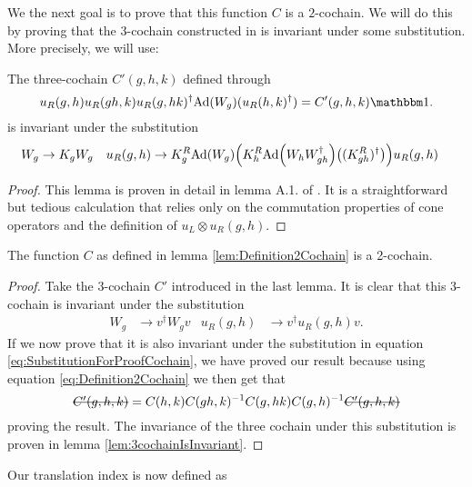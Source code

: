 \documentclass[11pt,a4paper,twoside]{article}
\numberwithin{equation}{section}
\begin{document}
	We the next goal is to prove that this function $C$ is a $2$-cochain. We will do this by proving that the $3$-cochain constructed in \cite{ogata2021h3gmathbb} is invariant under some substitution. More precisely, we will use:
	\begin{lemma}\label{lem:3cochainIsInvariant}
		The three-cochain $C'(g,h,k)$ defined through
		\begin{equation}\label{eq:defintion3CochainProof2Cochain}
			u_R(g,h)u_R(gh,k)u_R(g,hk)^\dagger\Ad{W_g}(u_R(h,k)^\dagger)=C'(g,h,k)\id.
		\end{equation}
		is invariant under the substitution
		\begin{align}\label{eq:SubstitutionForProofCochain}
			W_g&\rightarrow K_g W_g&u_R(g,h)&\rightarrow K_g^R\Ad{W_g}\left(K_h^R\Ad{W_hW_{gh}^\dagger}\left((K_{gh}^R)^\dagger\right)\right)u_
			R(g,h)
		\end{align}
	\end{lemma}
	\begin{proof}
		This lemma is proven in detail in lemma A.1. of \cite{jappens2023spt}. It is a straightforward but tedious calculation that relies only on the commutation properties of cone operators and the definition of $u_L\otimes u_R(g,h)$.
	\end{proof}
	\begin{lemma}
		The function $C$ as defined in lemma \ref{lem:Definition2Cochain} is a 2-cochain.
	\end{lemma}
	\begin{proof}
		Take the 3-cochain $C'$ introduced in the last lemma. It is clear that this 3-cochain is invariant under the substitution
		\begin{align}
			W_g&\rightarrow v^\dagger W_g v&u_R(g,h)&\rightarrow v^\dagger u_R(g,h)v.
		\end{align}
		If we now prove that it is also invariant under the substitution in equation \ref{eq:SubstitutionForProofCochain}, we have proved our result because using equation \eqref{eq:Definition2Cochain} we then get that
		\begin{equation}
			\stkout{C'(g,h,k)}=C(h,k)C(gh,k)^{-1}C(g,hk)C(g,h)^{-1}\stkout{C'(g,h,k)}
		\end{equation}
		proving the result. The invariance of the three cochain under this substitution is proven in lemma \ref{lem:3cochainIsInvariant}.
	\end{proof}
	Our translation index is now defined as
\end{document}

